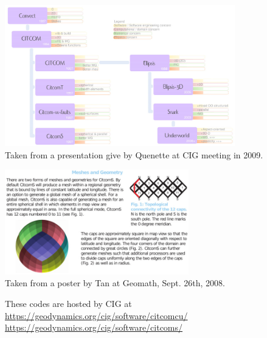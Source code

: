 \begin{itemize}
\begin{center}
\includegraphics[width=10cm]{images/codes/quenette_cig_2009}\\
{\captionfont Taken from a presentation give by Quenette at CIG meeting in 2009.}
\end{center}

\begin{center}
\includegraphics[width=8cm]{images/codes/CitcomS}\\
{\captionfont Taken from a poster by Tan \etal at Geomath, Sept. 26th, 2008.}
\end{center}

These codes are hosted by CIG at\\
\url{https://geodynamics.org/cig/software/citcomcu/}  \\
\url{https://geodynamics.org/cig/software/citcoms/}


\end{itemize}
